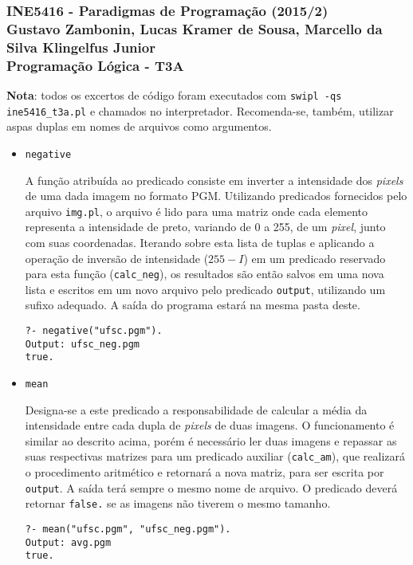 \documentclass{article}
\begin{document}
\subsubsection*{INE5416 - Paradigmas de Programação (2015/2) \\
    Gustavo Zambonin, Lucas Kramer de Sousa,
    Marcello da Silva Klingelfus Junior \\
    Programação Lógica - T3A
}

\textbf{Nota}: todos os excertos de código foram executados com
\texttt{swipl -qs ine5416\_t3a.pl} e chamados no interpretador. Recomenda-se,
também, utilizar aspas duplas em nomes de arquivos como argumentos.

\begin{itemize}

\item \texttt{negative}

A função atribuída ao predicado consiste em inverter a intensidade dos
\textit{pixels} de uma dada imagem no formato PGM. Utilizando predicados
fornecidos pelo arquivo \texttt{img.pl}, o arquivo é lido para uma matriz
onde cada elemento representa a intensidade de preto, variando de 0 a 255,
de um \textit{pixel}, junto com suas coordenadas. Iterando sobre esta lista
de tuplas e aplicando a operação de inversão de intensidade ($255 - I$) em
um predicado reservado para esta função (\texttt{calc\_neg}), os resultados
são então salvos em uma nova lista e escritos em um novo arquivo pelo
predicado \texttt{output}, utilizando um sufixo adequado. A saída do programa
estará na mesma pasta deste.
\begin{verbatim}
?- negative("ufsc.pgm").
Output: ufsc_neg.pgm
true.
\end{verbatim}

\item \texttt{mean}

Designa-se a este predicado a responsabilidade de calcular a média da
intensidade entre cada dupla de \textit{pixels} de duas imagens. O funcionamento
é similar ao descrito acima, porém é necessário ler duas imagens e repassar as
suas respectivas matrizes para um predicado auxiliar (\texttt{calc\_am}), que
realizará o procedimento aritmético e retornará a nova matriz, para ser escrita
por \texttt{output}. A saída terá sempre o mesmo nome de arquivo. O predicado
deverá retornar \texttt{false.} se as imagens não tiverem o mesmo tamanho.
\begin{verbatim}
?- mean("ufsc.pgm", "ufsc_neg.pgm").
Output: avg.pgm
true.
\end{verbatim}


\end{itemize}
\end{document}
